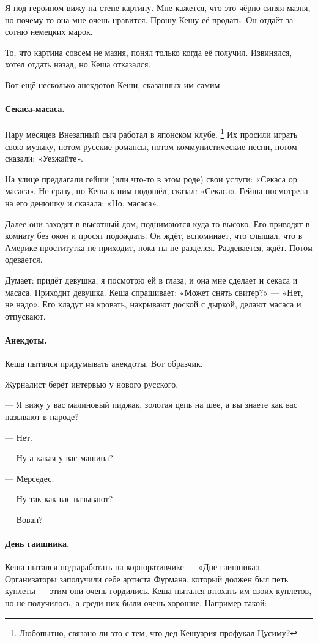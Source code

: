 \documentclass{book}
\begin{document}
Я под героином вижу на стене картину.
Мне кажется, что это чёрно-синяя мазня, но почему-то она мне очень нравится.
Прошу Кешу её продать.
Он отдаёт за сотню немецких марок.

То, что картина совсем не мазня, понял только когда её получил.
Извинялся, хотел отдать назад, но Кеша отказался.

\medskip

Вот ещё несколько анекдотов Кеши, сказанных им самим.

\paragraph{Секаса-масаса.}
Пару месяцев Внезапный сыч работал в японском клубе.%
\footnote{Любопытно, связано ли это с тем, что дед Кешуария профукал Цусиму?}
Их просили играть свою музыку, потом русские романсы, потом коммунистические песни, потом сказали: «Уезжайте».

На улице предлагали гейши (или что-то в этом роде) свои услуги: «Секаса ор масаса».
Не сразу, но Кеша к ним подошёл, сказал: «Секаса».
Гейша посмотрела на его денюшку и сказала: «Но, масаса».

Далее они заходят в высотный дом, поднимаются куда-то высоко.
Его приводят в комнату без окон и просят подождать.
Он ждёт, вспоминает, что слышал, что в Америке проститутка не приходит, пока ты не разделся.
Раздевается, ждёт.
Потом одевается.

Думает: придёт девушка, я посмотрю ей в глаза, и она мне сделает и секаса и масаса.
Приходит девушка.
Кеша спрашивает: «Может снять свитер?» --- «Нет, не надо».
Его кладут на кровать, накрывают доской с дыркой, делают масаса и отпускают.

\paragraph{Анекдоты.}
Кеша пытался придумывать анекдоты.
Вот образчик.

Журналист берёт интервью у нового русского.

--- Я вижу у вас малиновый пиджак, золотая цепь на шее, а вы знаете как вас называют в народе?

--- Нет.

--- Ну а какая у вас машина?

--- Мерседес.

--- Ну так как вас называют?

--- Вован?


\paragraph{День гаишника.}
Кеша пытался подзаработать на корпоративчике --- «Дне гаишника».
Организаторы заполучили себе артиста Фурмана, который должен был петь куплеты --- этим они очень гордились.
Кеша пытался втюхать им своих куплетов, но не получилось, а среди них были очень хорошие.
Например такой:
\end{document}
